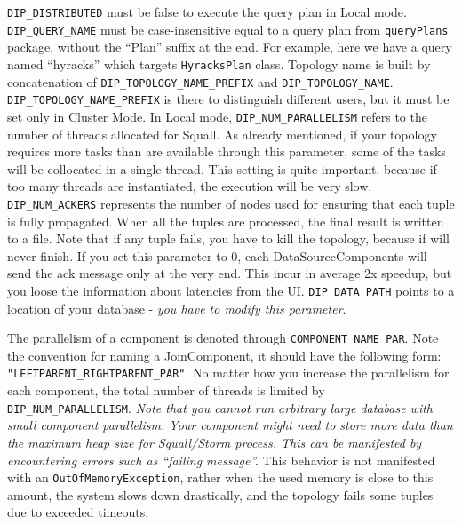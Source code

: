 \documentclass[a4paper,10pt]{article}
\begin{document}
\verb|DIP_DISTRIBUTED| must be false to execute the query plan in Local mode. \verb|DIP_QUERY_NAME| must be case-insensitive equal to a query plan from \verb#queryPlans# package, without the ``Plan'' suffix at the end. For example, here we have a query named ``hyracks'' which targets \verb#HyracksPlan# class. Topology name is built by concatenation of \verb#DIP_TOPOLOGY_NAME_PREFIX# and \verb|DIP_TOPOLOGY_NAME|. \\ \verb#DIP_TOPOLOGY_NAME_PREFIX# is there to distinguish different users, but it must be set only in Cluster Mode. In Local mode, \verb|DIP_NUM_PARALLELISM| refers to the number of threads allocated for Squall. As already mentioned, if your topology requires more tasks than are available through this parameter, some of the tasks will be collocated in a single thread. This setting is quite important, because if too many threads are instantiated, the execution will be very slow. \verb|DIP_NUM_ACKERS| represents the number of nodes used for ensuring that each tuple is fully propagated. When all the tuples are processed, the final result is written to a file. Note that if any tuple fails, you have to kill the topology, because if will never finish. If you set this parameter to 0, each DataSourceComponents will send the ack message only at the very end. This incur in average 2x speedup, but you loose the information about latencies from the UI. \verb|DIP_DATA_PATH| points to a location of your database - \textit{you have to modify this parameter}.

The parallelism of a component is denoted through \verb|COMPONENT_NAME_PAR|. Note the convention for naming a JoinComponent, it should have the following form: \\ \verb|"LEFTPARENT_RIGHTPARENT_PAR"|. No matter how you increase the parallelism for each component, the total number of threads is limited by \\ \verb|DIP_NUM_PARALLELISM|. \textit{Note that you cannot run arbitrary large database with small component parallelism. Your component might need to store more data than the maximum heap size for Squall/Storm process. This can be manifested by encountering errors such as ``failing message''.} This behavior is not manifested with an \verb|OutOfMemoryException|, rather when the used memory is close to this amount, the system slows down drastically, and the topology fails some tuples due to exceeded timeouts.
\end{document}
